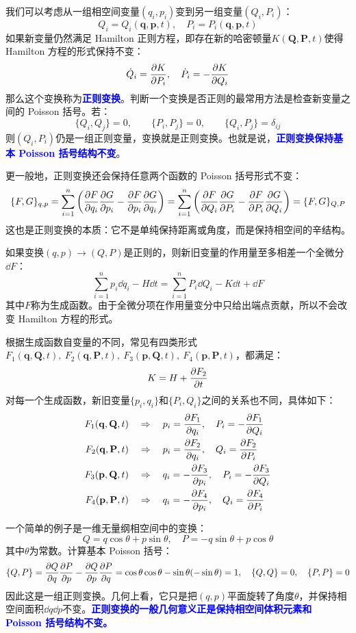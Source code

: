 我们可以考虑从一组相空间变量$(q_i,p_i)$变到另一组变量$(Q_i,P_i)$：
\[Q_i=Q_i(\mathbf{q},\mathbf{p},t),\quad P_i=P_i(\mathbf{q},\mathbf{p},t)\]
如果新变量仍然满足 Hamilton 正则方程，即存在新的哈密顿量$K(\mathbf{Q},\mathbf{P},t)$使得 Hamilton 方程的形式保持不变：
\[\dot{Q}_i=\pdv{K}{P_i},\quad \dot{P}_i=-\pdv{K}{Q_i}\]
那么这个变换称为\textcolor{blue}{\textbf{正则变换}}。判断一个变换是否正则的最常用方法是检查新变量之间的 Poisson 括号。若：
\[\{Q_i,Q_j\}=0,\qquad \{P_i,P_j\}=0,\qquad \{Q_i,P_j\}=\delta_{ij}\]
则$(Q_i,P_i)$仍是一组正则变量，变换就是正则变换。也就是说，\textcolor{blue}{\textbf{正则变换保持基本 Poisson 括号结构不变}}。

更一般地，正则变换还会保持任意两个函数的 Poisson 括号形式不变：
\[\{F,G\}_{q,p}=\sum_{i=1}^{n}\left(\pdv{F}{q_i}\pdv{G}{p_i}-\pdv{F}{p_i}\pdv{G}{q_i}\right)=\sum_{i=1}^{n}\left(\pdv{F}{Q_i}\pdv{G}{P_i}-\pdv{F}{P_i}\pdv{G}{Q_i}\right)=\{F,G\}_{Q,P}\]
这也是正则变换的本质：它不是单纯保持距离或角度，而是保持相空间的辛结构。

如果变换$(q,p)\to(Q,P)$是正则的，则新旧变量的作用量至多相差一个全微分$\dd{F}$：
\[\sum_{i=1}^{n}p_i\dd{q_i}-H\dd{t}=\sum_{i=1}^{n}P_i\dd{Q_i}-K\dd{t}+\dd{F}\]
其中$F$称为生成函数。由于全微分项在作用量变分中只给出端点贡献，所以不会改变 Hamilton 方程的形式。

\begin{definition}[生成函数]
根据生成函数自变量的不同，常见有四类形式$F_1(\mathbf{q},\mathbf{Q},t), \ F_2(\mathbf{q},\mathbf{P},t), \ F_3(\mathbf{p},\mathbf{Q},t), \ F_4(\mathbf{p},\mathbf{P},t)$，都满足：
\[K=H+\pdv{F_2}{t}\]
对每一个生成函数，新旧变量$\{p_i, q_i\}$和$\{P_i, Q_i\}$之间的关系也不同，具体如下：
\[\begin{aligned}
F_1(\mathbf{q},\mathbf{Q},t) & \quad \Rightarrow \quad p_i=\pdv{F_1}{q_i},\quad P_i=-\pdv{F_1}{Q_i}\\
F_2(\mathbf{q},\mathbf{P},t) & \quad \Rightarrow \quad p_i=\pdv{F_2}{q_i},\quad Q_i=\pdv{F_2}{P_i}\\
F_3(\mathbf{p},\mathbf{Q},t) & \quad \Rightarrow \quad q_i=-\pdv{F_3}{p_i},\quad P_i=-\pdv{F_3}{Q_i}\\
F_4(\mathbf{p},\mathbf{P},t) & \quad \Rightarrow \quad q_i=-\pdv{F_4}{p_i},\quad Q_i=\pdv{F_4}{P_i}
\end{aligned}\]
\end{definition}

一个简单的例子是一维无量纲相空间中的变换：
\[Q=q\cos\theta+p\sin\theta,\quad P=-q\sin\theta+p\cos\theta\]
其中$\theta$为常数。计算基本 Poisson 括号：
\[\{Q,P\}=\pdv{Q}{q}\pdv{P}{p}-\pdv{Q}{p}\pdv{P}{q}=\cos\theta\cos\theta-\sin\theta(-\sin\theta)=1, \quad \{Q,Q\}=0,\quad \{P,P\}=0\]
因此这是一组正则变换。几何上看，它只是把$(q,p)$平面旋转了角度$\theta$，并保持相空间面积$\dd{q}\dd{p}$不变。\textcolor{blue}{\textbf{正则变换的一般几何意义正是保持相空间体积元素和 Poisson 括号结构不变。}}

